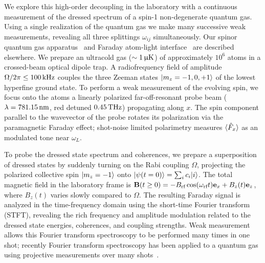 \documentclass[aps,prl,reprint,superscriptaddress,floatfix]{revtex4-1}
\begin{document}
We explore this high-order decoupling in the laboratory with a continuous measurement of the dressed spectrum of a spin-1 non-degenerate quantum gas.
Using a single realization of the quantum gas we make many successive weak measurements, revealing all three splittings $\omega_{ij}$ simultaneously.
Our spinor quantum gas apparatus~\cite{wood_magnetic_2015} and Faraday atom-light interface~\cite{jasperse_magic-wavelength_2017} are described elsewhere.
We prepare an ultracold gas ($\sim \unit[1]{\upmu K}$) of approximately $10^6$ \Rb atoms in a crossed-beam optical dipole trap.
A radiofrequency field of amplitude $\Omega/2\pi \leq \unit[100]{kHz}$ couples the three Zeeman states $\vert m_z=-1,0,+1 \rangle $ of the lowest hyperfine ground state.
To perform a weak measurement of the evolving spin, we focus onto the atoms a linearly polarized far-off-resonant probe beam ($\lambda=\unit[781.15]{nm}$, red detuned $\unit[0.45]{THz}$) propagating along $x$.
The spin component parallel to the wavevector of the probe rotates its polarization via the paramagnetic Faraday effect; shot-noise limited polarimetry measures $\langle \hat{F}_x \rangle$ as an modulated tone near $\omega_L$.

To probe the dressed state spectrum and coherences, we prepare a superposition of dressed states by suddenly turning on the Rabi coupling $\Omega$, projecting the polarized collective spin $\vert m_z=-1 \rangle $ onto $\vert \psi(t=0) \rangle  = \sum_i c_i \vert i \rangle $.
The total magnetic field in the laboratory frame is $\mathbf{B}(t \geq 0) = -B_{\text{rf}} \cos (\omega_{\text{rf}} t) \mathbf{e}_x + B_z(t) \mathbf{e}_z$, where $B_z(t)$ varies slowly compared to $\Omega$.
The resulting Faraday signal is analyzed in the time-frequency domain using the short-time Fourier transform (STFT), revealing the rich frequency and amplitude modulation related to the dressed state energies, coherences, and coupling strengths.
Weak measurement allows this Fourier transform spectroscopy to be performed many times in one shot; recently Fourier transform spectroscopy has been applied to a quantum gas using projective measurements over many shots~\cite{valdes-curiel_fourier_2017}.
\end{document}
